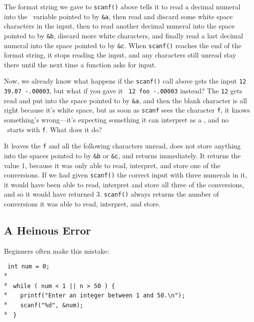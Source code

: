 The format string we gave to {\tt scanf()} above tells it to read a
decimal numeral into the \double\ variable pointed to by {\tt \&a}, then
read and discard some white space characters in the input, then to read
another decimal numeral into the space pointed to by {\tt\&b}, discard
more white characters, and finally read a last decimal numeral into the
space pointed to by {\tt\&c}.  When {\tt scanf()} reaches the end of the
format string, it stops reading the input, and any characters still
unread stay there until the next time a function asks for input.

Now, we already know what happens if the {\tt scanf()} call above gets
the input \mbox{\tt 12 39.07 -.00003}, but what if you gave it \mbox{\tt
12 foo -.00003} instead?  The {\tt 12} gets read and put into the space
pointed to by {\tt\&a}, and then the blank character is all right
because it's white space, but as soon as {\tt scanf} sees the character
{\tt f}, it knows something's wrong---it's expecting something it can
interpret as a \double, and no \double\ starts with {\tt f}.  What does
it do?

It leaves the {\tt f} and all the following characters unread, does not
store anything into the spaces pointed to by {\tt\&b} or {\tt\&c}, and
returns immediately.  It returns the value 1, because it was only able
to read, interpret, and store one of the conversions.  If we had given
{\tt scanf()} the correct input with three numerals in it, it would have
been able to read, interpret and store all three of the conversions, and
so it would have returned 3.  {\tt scanf()} always returns the number of
conversions it was able to read, interpret, and store.

\subsection{A Heinous Error}

Beginners often make this mistake:
\label{heinous-error}

\begin{flushleft}
\verb! int num = 0; ! \\*
\verb!  ! \\*
\verb! while ( num < 1 || n > 50 ) { ! \\*
\verb!   printf("Enter an integer between 1 and 50.\n"); ! \\*
\verb!   scanf("%d", &num); ! \\*
\verb! } ! 
\end{flushleft}

